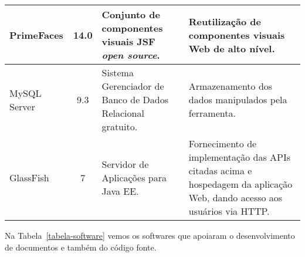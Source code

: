 \begin{footnotesize}
\begin{longtable}{|p{1.8cm}|c|p{5cm}|p{6.3cm}|}
	PrimeFaces & 14.0 &  Conjunto de componentes visuais JSF \textit{open source}. & Reutilização de componentes visuais Web de alto nível. \\\hline
	
	MySQL Server & 9.3 & Sistema Gerenciador de Banco de Dados Relacional gratuito. & Armazenamento dos dados manipulados pela ferramenta. \\\hline
	
	GlassFish & 7 & Servidor de Aplicações para Java EE. & Fornecimento de implementação das APIs citadas acima e hospedagem da aplicação Web, dando acesso aos usuários via HTTP. \\\hline
\end{longtable}
\end{footnotesize}







Na Tabela~\ref{tabela-software} vemos os softwares que apoiaram o desenvolvimento de documentos e também do código fonte.

